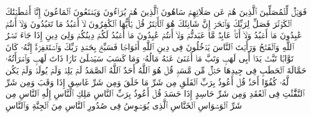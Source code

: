 \startbuffer[\q:107:4]
فَوَیۡلࣱ لِّلۡمُصَلِّینَ%
\stopbuffer
\startbuffer[\q:107:5]
ٱلَّذِینَ هُمۡ عَن صَلَاتِهِمۡ سَاهُونَ%
\stopbuffer
\startbuffer[\q:107:6]
ٱلَّذِینَ هُمۡ یُرَاۤءُونَ%
\stopbuffer
\startbuffer[\q:107:7]
وَیَمۡنَعُونَ ٱلۡمَاعُونَ%
\stopbuffer
\startbuffer[\q:108:1]
إِنَّاۤ أَعۡطَیۡنَٰكَ ٱلۡكَوۡثَرَ%
\stopbuffer
\startbuffer[\q:108:2]
فَصَلِّ لِرَبِّكَ وَٱنۡحَرۡ%
\stopbuffer
\startbuffer[\q:108:3]
إِنَّ شَانِئَكَ هُوَ ٱلۡأَبۡتَرُ%
\stopbuffer
\startbuffer[\q:109:1]
قُلۡ یَٰۤأَیُّهَا ٱلۡكَٰفِرُونَ%
\stopbuffer
\startbuffer[\q:109:2]
لَاۤ أَعۡبُدُ مَا تَعۡبُدُونَ%
\stopbuffer
\startbuffer[\q:109:3]
وَلَاۤ أَنتُمۡ عَٰبِدُونَ مَاۤ أَعۡبُدُ%
\stopbuffer
\startbuffer[\q:109:4]
وَلَاۤ أَنَا۠ عَابِدࣱ مَّا عَبَدتُّمۡ%
\stopbuffer
\startbuffer[\q:109:5]
وَلَاۤ أَنتُمۡ عَٰبِدُونَ مَاۤ أَعۡبُدُ%
\stopbuffer
\startbuffer[\q:109:6]
لَكُمۡ دِینُكُمۡ وَلِیَ دِینِ%
\stopbuffer
\startbuffer[\q:110:1]
إِذَا جَاۤءَ نَصۡرُ ٱللَّهِ وَٱلۡفَتۡحُ%
\stopbuffer
\startbuffer[\q:110:2]
وَرَأَیۡتَ ٱلنَّاسَ یَدۡخُلُونَ فِی دِینِ ٱللَّهِ أَفۡوَاجࣰا%
\stopbuffer
\startbuffer[\q:110:3]
فَسَبِّحۡ بِحَمۡدِ رَبِّكَ وَٱسۡتَغۡفِرۡهُۚ إِنَّهُۥ كَانَ تَوَّابَۢا%
\stopbuffer
\startbuffer[\q:111:1]
تَبَّتۡ یَدَاۤ أَبِی لَهَبࣲ وَتَبَّ%
\stopbuffer
\startbuffer[\q:111:2]
مَاۤ أَغۡنَىٰ عَنۡهُ مَالُهُۥ وَمَا كَسَبَ%
\stopbuffer
\startbuffer[\q:111:3]
سَیَصۡلَىٰ نَارࣰا ذَاتَ لَهَبࣲ%
\stopbuffer
\startbuffer[\q:111:4]
وَٱمۡرَأَتُهُۥ حَمَّالَةَ ٱلۡحَطَبِ%
\stopbuffer
\startbuffer[\q:111:5]
فِی جِیدِهَا حَبۡلࣱ مِّن مَّسَدِۭ%
\stopbuffer
\startbuffer[\q:112:1]
قُلۡ هُوَ ٱللَّهُ أَحَدٌ%
\stopbuffer
\startbuffer[\q:112:2]
ٱللَّهُ ٱلصَّمَدُ%
\stopbuffer
\startbuffer[\q:112:3]
لَمۡ یَلِدۡ وَلَمۡ یُولَدۡ%
\stopbuffer
\startbuffer[\q:112:4]
وَلَمۡ یَكُن لَّهُۥ كُفُوًا أَحَدُۢ%
\stopbuffer
\startbuffer[\q:113:1]
قُلۡ أَعُوذُ بِرَبِّ ٱلۡفَلَقِ%
\stopbuffer
\startbuffer[\q:113:2]
مِن شَرِّ مَا خَلَقَ%
\stopbuffer
\startbuffer[\q:113:3]
وَمِن شَرِّ غَاسِقٍ إِذَا وَقَبَ%
\stopbuffer
\startbuffer[\q:113:4]
وَمِن شَرِّ ٱلنَّفَّٰثَٰتِ فِی ٱلۡعُقَدِ%
\stopbuffer
\startbuffer[\q:113:5]
وَمِن شَرِّ حَاسِدٍ إِذَا حَسَدَ%
\stopbuffer
\startbuffer[\q:114:1]
قُلۡ أَعُوذُ بِرَبِّ ٱلنَّاسِ%
\stopbuffer
\startbuffer[\q:114:2]
مَلِكِ ٱلنَّاسِ%
\stopbuffer
\startbuffer[\q:114:3]
إِلَٰهِ ٱلنَّاسِ%
\stopbuffer
\startbuffer[\q:114:4]
مِن شَرِّ ٱلۡوَسۡوَاسِ ٱلۡخَنَّاسِ%
\stopbuffer
\startbuffer[\q:114:5]
ٱلَّذِی یُوَسۡوِسُ فِی صُدُورِ ٱلنَّاسِ%
\stopbuffer
\startbuffer[\q:114:6]
مِنَ ٱلۡجِنَّةِ وَٱلنَّاسِ%
\stopbuffer
